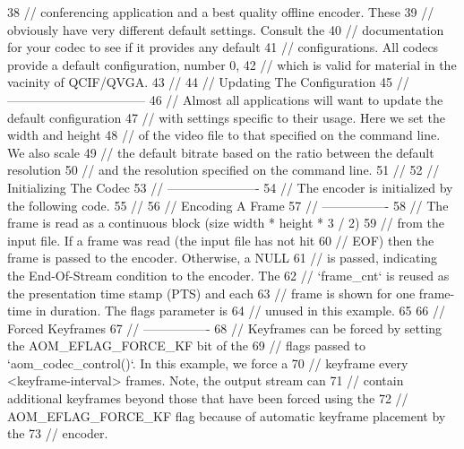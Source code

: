 \begin{DoxyCodeInclude}
38 \textcolor{comment}{// conferencing application and a best quality offline encoder. These}
39 \textcolor{comment}{// obviously have very different default settings. Consult the}
40 \textcolor{comment}{// documentation for your codec to see if it provides any default}
41 \textcolor{comment}{// configurations. All codecs provide a default configuration, number 0,}
42 \textcolor{comment}{// which is valid for material in the vacinity of QCIF/QVGA.}
43 \textcolor{comment}{//}
44 \textcolor{comment}{// Updating The Configuration}
45 \textcolor{comment}{// ---------------------------------}
46 \textcolor{comment}{// Almost all applications will want to update the default configuration}
47 \textcolor{comment}{// with settings specific to their usage. Here we set the width and height}
48 \textcolor{comment}{// of the video file to that specified on the command line. We also scale}
49 \textcolor{comment}{// the default bitrate based on the ratio between the default resolution}
50 \textcolor{comment}{// and the resolution specified on the command line.}
51 \textcolor{comment}{//}
52 \textcolor{comment}{// Initializing The Codec}
53 \textcolor{comment}{// ----------------------}
54 \textcolor{comment}{// The encoder is initialized by the following code.}
55 \textcolor{comment}{//}
56 \textcolor{comment}{// Encoding A Frame}
57 \textcolor{comment}{// ----------------}
58 \textcolor{comment}{// The frame is read as a continuous block (size width * height * 3 / 2)}
59 \textcolor{comment}{// from the input file. If a frame was read (the input file has not hit}
60 \textcolor{comment}{// EOF) then the frame is passed to the encoder. Otherwise, a NULL}
61 \textcolor{comment}{// is passed, indicating the End-Of-Stream condition to the encoder. The}
62 \textcolor{comment}{// `frame\_cnt` is reused as the presentation time stamp (PTS) and each}
63 \textcolor{comment}{// frame is shown for one frame-time in duration. The flags parameter is}
64 \textcolor{comment}{// unused in this example.}
65 
66 \textcolor{comment}{// Forced Keyframes}
67 \textcolor{comment}{// ----------------}
68 \textcolor{comment}{// Keyframes can be forced by setting the AOM\_EFLAG\_FORCE\_KF bit of the}
69 \textcolor{comment}{// flags passed to `aom\_codec\_control()`. In this example, we force a}
70 \textcolor{comment}{// keyframe every <keyframe-interval> frames. Note, the output stream can}
71 \textcolor{comment}{// contain additional keyframes beyond those that have been forced using the}
72 \textcolor{comment}{// AOM\_EFLAG\_FORCE\_KF flag because of automatic keyframe placement by the}
73 \textcolor{comment}{// encoder.}

\end{DoxyCodeInclude}
